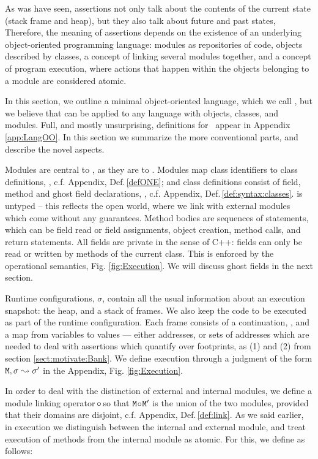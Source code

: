 \renewcommand{\appref}[1]{, c.f. Appendix, Def.\,\ref{#1}}

 
As was have seen, \Chainmail assertions not only talk about the contents of the current state (stack frame and heap),
but they also talk about future and past states, Therefore, the meaning of \Chainmail assertions depends on the existence of an
underlying object-oriented programming language: modules as repositories of code, objects described by classes,
a concept of linking several modules together, and a concept of 
program execution, where  actions that happen within the objects belonging to a module are considered atomic.

In this section, we outline a minimal object-oriented language, which we call  \LangOO, but we believe that \Chainmail can be applied to 
any language with objects, classes, and modules.
Full, and mostly unsurprising,
 definitions for  \LangOO~appear in Appendix \ref{app:LangOO}. 
In this section we summarize the more conventional parts, and describe the novel aspects. 

Modules are central to \LangOO, as they are to \Chainmail. Modules map
class identifiers to class definitions, \appref{defONE}; and class
definitions consist of field, method and ghost field declarations,
\appref{def:syntax:classes}.  \LangOO is untyped -- this reflects the
open world, where we link with external modules which come without any
guarantees.
Method bodies are sequences of 
statements, which  can be field read or field assignments, object
creation, method calls, and return statements. 
All fields are private in the sense of C++: fields can only be read or
written by methods of the current class.
This is enforced by the operational semantics, \cf Fig.  \ref{fig:Execution}.
We will discuss ghost fields in the next section.

Runtime configurations, $\sigma$,  contain   all the usual information about an execution snapshot: the heap, and a
stack of frames. We also keep the code to be executed as part of the runtime configuration.
%
Each frame consists of a continuation, , and a map from
variables to values --- either addresses, or sets of addresses which
are needed to deal with assertions which quantify over footprints, as
\eg (1) and (2) from section \ref{sect:motivate:Bank}.
% 
We define execution  through a judgment of the form ${\mbox{\tt{\ensuremath{{\mbox{\tt{M}}}}}}}, \sigma \leadsto \sigma'$ in the Appendix, Fig.  \ref{fig:Execution}. 
%
  

In  order to deal with the distinction of external and internal modules, we define a module linking operator  $\!\circ\!$ so that
${\mbox{\tt{\ensuremath{{\mbox{\tt{M}}}}}}}\!\circ\!{\mbox{\tt{\ensuremath{{\mbox{\tt{M}}}}}}}'$ is the union of the two modules, provided that their domains are disjoint\appref{def:link}.
%
As we said earlier, in execution we distinguish  between the internal and external module, and treat  execution of 
methods from the internal module as atomic. For this, we define as follows:

